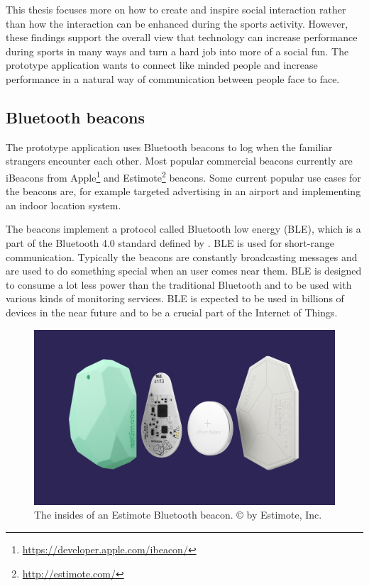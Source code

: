 This thesis focuses more on how to create and inspire social interaction rather than how the interaction can be enhanced during the sports activity. However, these findings support the overall view that technology can increase performance during sports in many ways and turn a hard job into more of a social fun. The prototype application wants to connect like minded people and increase performance in a natural way of communication between people face to face. 

\subsection{Bluetooth beacons}

The prototype application uses Bluetooth beacons to log when the familiar strangers encounter each other. Most popular commercial beacons currently are iBeacons from Apple\footnote{\url{https://developer.apple.com/ibeacon/}} and Estimote\footnote{\url{http://estimote.com/}} beacons. Some current popular use cases for the beacons are, for example targeted advertising in an airport and implementing an indoor location system.

The beacons implement a protocol called Bluetooth low energy (BLE), which is a part of the Bluetooth 4.0 standard defined by \cite{bluetooth}. BLE is used for short-range communication. Typically the beacons are constantly broadcasting messages and are used to do something special when an user comes near them. BLE is designed to consume a lot less power than the traditional Bluetooth and to be used with various kinds of monitoring services. BLE is expected to be used in billions of devices in the near future and to be a crucial part of the Internet of Things\citep{bluetoothOverview}.

\begin{figure}[htb]
	\begin{center}
		\includegraphics[width=1\textwidth]{estimote_beacons.jpg}
		\caption{The insides of an Estimote Bluetooth beacon. © by Estimote, Inc.}
	\end{center}
\end{figure}


